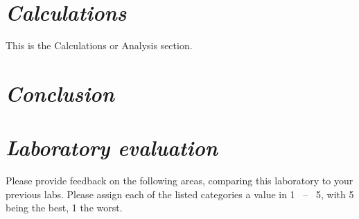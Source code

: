 \documentclass[epsfig,12pt]{article}
\begin{document}
\section*{\textit{Calculations}}

	This is the Calculations or Analysis section.


\section*{\textit{Conclusion}}


\newpage
\section*{\textit{Laboratory evaluation}}

	Please provide feedback on the following areas, comparing this laboratory to your previous labs.
	Please assign each of the listed categories a value in 1 ~--~ 5, with 5 being the best, 1 the worst.
\end{document}
